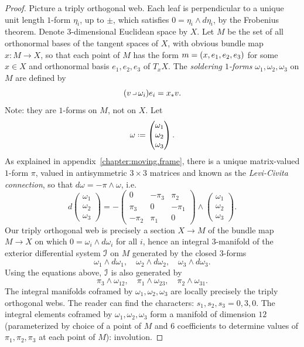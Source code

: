 \begin{proof}
Picture a triply orthogonal web.
Each leaf is perpendicular to a unique unit length \(1\)-form \(\eta_i\), up to \(\pm\), which satisfies \(0=\eta_i \wedge d \eta_i\), by the Frobenius theorem.
Denote \(3\)-dimensional Euclidean space by \(X\).
Let \(M\) be the set of all orthonormal bases of the tangent spaces of \(X\), with obvious bundle map \(x \colon M \to X\), so that each point of \(M\) has the form \(m=\left(x,e_1,e_2,e_3\right)\) for some \(x \in X\) and orthonormal basis \(e_1,e_2,e_3\) of \(T_x X\).
The \emph{soldering \(1\)-forms} \(\omega_1, \omega_2, \omega_3\) on \(M\) are defined by 
\[
(v \hook \omega_i)e_i = x_* v.
\]
Note: they are \(1\)-forms on \(M\), not on \(X\).
Let 
\[
\omega
\defeq
\begin{pmatrix}
\omega_1 \\
\omega_2 \\
\omega_3
\end{pmatrix}.
\]
As explained in appendix~\ref{chapter:moving.frame}, there is a unique matrix-valued \(1\)-form \(\pi\), valued in antisymmetric \(3 \times 3\) matrices and known as the \emph{Levi-Civita connection}, so that \(d \omega = -\pi \wedge \omega\), i.e.
\[
d
\begin{pmatrix}
\omega_1 \\
\omega_2 \\
\omega_3
\end{pmatrix}
=
-
\begin{pmatrix}
0 & -\pi_3 & \pi_2 \\
\pi_3 & 0 & -\pi_1 \\
-\pi_2 & \pi_1 & 0
\end{pmatrix}
\wedge
\begin{pmatrix}
\omega_1 \\
\omega_2 \\
\omega_3
\end{pmatrix}.
\]
Our triply orthogonal web is precisely a section \(X \to M\) of the bundle map \(M \to X\) on which \(0=\omega_i \wedge d\omega_i\) for all \(i\), hence an integral \(3\)-manifold of the exterior differential system \(\mathcal{I}\) on \(M\) generated by the closed \(3\)-forms
\[
\omega_1 \wedge d \omega_1, \quad
\omega_2 \wedge d \omega_2, \quad
\omega_3 \wedge d \omega_3.
\]
Using the equations above, \(\mathcal{I}\) is also generated by
\[
\pi_3 \wedge \omega_{12}, \quad
\pi_1 \wedge \omega_{23}, \quad
\pi_2 \wedge \omega_{31}.
\]
The integral manifolds coframed by \(\omega_1,\omega_2,\omega_3\) are locally precisely the triply orthogonal webs.
The reader can find the characters: \(s_1,s_2,s_3=0,3,0\).
The integral elements coframed by \(\omega_1,\omega_2,\omega_3\) form a manifold of dimension \(12\) (parameterized by choice of a point of \(M\) and \(6\) coefficients to determine values of \(\pi_1,\pi_2,\pi_3\) at each point of \(M\)): involution.
\end{proof}
